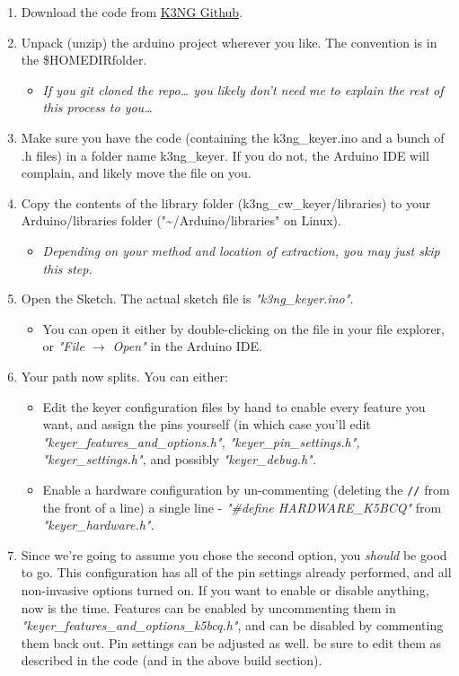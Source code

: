\documentclass[11pt]{article}
\begin{document}
\begin{enumerate}
\item Download the code from \href{https://github.com/k3ng/k3ng\_cw\_keyer}{K3NG Github}.
\item Unpack (unzip) the arduino project wherever you like.  The convention is in the \$HOMEDIR\Arduino folder.
\begin{itemize}
\item \emph{If you git cloned the repo\ldots{} you likely don't need me to explain the rest of this process to you\ldots{}}
\end{itemize}
\item Make sure you have the code (containing the k3ng\_keyer.ino and a bunch of .h files) in a folder name k3ng\_keyer.  If you do not, the Arduino IDE will complain, and likely move the file on you.
\item Copy the contents of the library folder (k3ng\_cw\_keyer/libraries) to your Arduino/libraries folder ("\textasciitilde{}/Arduino/libraries" on Linux).
\begin{itemize}
\item \emph{Depending on your method and location of extraction, you may just skip this step.}
\end{itemize}
\item Open the Sketch.  The actual sketch file is \emph{"k3ng\_keyer.ino".}
\begin{itemize}
\item You can open it either by double-clicking on the file in your file explorer, or \emph{"File \(\rightarrow\) Open"} in the Arduino IDE.
\end{itemize}
\item Your path now splits.  You can either:
\begin{itemize}
\item Edit the keyer configuration files by hand to enable every feature you want, and assign the pins yourself (in which case you'll edit \emph{"keyer\_features\_and\_options.h", "keyer\_pin\_settings.h", "keyer\_settings.h",} and possibly \emph{"keyer\_debug.h".}
\item Enable a hardware configuration by un-commenting (deleting the \texttt{//} from the front of a line) a single line - \emph{"\#define HARDWARE\_K5BCQ"} from \emph{"keyer\_hardware.h".}
\end{itemize}
\item Since we're going to assume you chose the second option, you \emph{should} be good to go.  This configuration has all of the pin settings already performed, and all non-invasive options turned on.  If you want to enable or disable anything, now is the time.  Features can be enabled by uncommenting them in \emph{"keyer\_features\_and\_options\_k5bcq.h"}, and can be disabled by commenting them back out.  Pin settings can be adjusted as well.  be sure to edit them as described in the code (and in the above build section).

\end{enumerate}
\end{document}
